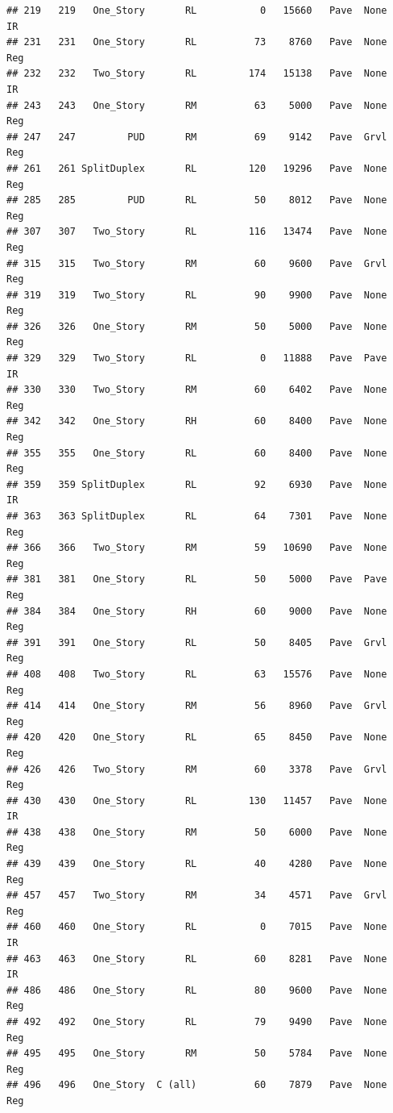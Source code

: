 \documentclass[]{article}
\begin{document}
\begin{verbatim}
## 219   219   One_Story       RL           0   15660   Pave  None       IR
## 231   231   One_Story       RL          73    8760   Pave  None      Reg
## 232   232   Two_Story       RL         174   15138   Pave  None       IR
## 243   243   One_Story       RM          63    5000   Pave  None      Reg
## 247   247         PUD       RM          69    9142   Pave  Grvl      Reg
## 261   261 SplitDuplex       RL         120   19296   Pave  None      Reg
## 285   285         PUD       RL          50    8012   Pave  None      Reg
## 307   307   Two_Story       RL         116   13474   Pave  None      Reg
## 315   315   Two_Story       RM          60    9600   Pave  Grvl      Reg
## 319   319   Two_Story       RL          90    9900   Pave  None      Reg
## 326   326   One_Story       RM          50    5000   Pave  None      Reg
## 329   329   Two_Story       RL           0   11888   Pave  Pave       IR
## 330   330   Two_Story       RM          60    6402   Pave  None      Reg
## 342   342   One_Story       RH          60    8400   Pave  None      Reg
## 355   355   One_Story       RL          60    8400   Pave  None      Reg
## 359   359 SplitDuplex       RL          92    6930   Pave  None       IR
## 363   363 SplitDuplex       RL          64    7301   Pave  None      Reg
## 366   366   Two_Story       RM          59   10690   Pave  None      Reg
## 381   381   One_Story       RL          50    5000   Pave  Pave      Reg
## 384   384   One_Story       RH          60    9000   Pave  None      Reg
## 391   391   One_Story       RL          50    8405   Pave  Grvl      Reg
## 408   408   Two_Story       RL          63   15576   Pave  None      Reg
## 414   414   One_Story       RM          56    8960   Pave  Grvl      Reg
## 420   420   One_Story       RL          65    8450   Pave  None      Reg
## 426   426   Two_Story       RM          60    3378   Pave  Grvl      Reg
## 430   430   One_Story       RL         130   11457   Pave  None       IR
## 438   438   One_Story       RM          50    6000   Pave  None      Reg
## 439   439   One_Story       RL          40    4280   Pave  None      Reg
## 457   457   Two_Story       RM          34    4571   Pave  Grvl      Reg
## 460   460   One_Story       RL           0    7015   Pave  None       IR
## 463   463   One_Story       RL          60    8281   Pave  None       IR
## 486   486   One_Story       RL          80    9600   Pave  None      Reg
## 492   492   One_Story       RL          79    9490   Pave  None      Reg
## 495   495   One_Story       RM          50    5784   Pave  None      Reg
## 496   496   One_Story  C (all)          60    7879   Pave  None      Reg

\end{verbatim}
\end{document}
